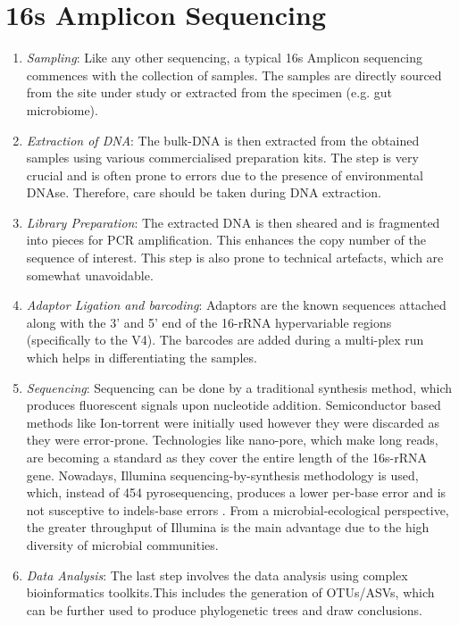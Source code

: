 \section{16s Amplicon Sequencing}

\begin{enumerate}
  \item \textit{Sampling}: Like any other sequencing, a typical 16s Amplicon sequencing commences with the collection of samples. The samples are directly sourced from the site under study or extracted from the specimen (e.g. gut microbiome).
  \item \textit{Extraction of DNA}: The bulk-DNA is then extracted from the obtained samples using various commercialised preparation kits. The step is very crucial and is often prone to errors due to the presence of environmental DNAse. Therefore, care should be taken during DNA extraction.
  \item \textit{Library Preparation}: The extracted DNA is then sheared and is fragmented into pieces for PCR amplification. This enhances the copy number of the sequence of interest. This step is also prone to technical artefacts, which are somewhat unavoidable. 
  \item \textit{Adaptor Ligation and barcoding}: Adaptors are the known sequences attached along with the 3' and 5' end of the 16-rRNA hypervariable regions (specifically to the V4). The barcodes are added during a multi-plex run which helps in differentiating the samples.
  \item \textit{Sequencing}: Sequencing can be done by a traditional synthesis method, which produces fluorescent signals upon nucleotide addition. Semiconductor based methods like Ion-torrent were initially used however they were discarded as they were error-prone. Technologies like nano-pore, which make long reads, are becoming a standard as they cover the entire length of the 16s-rRNA gene. Nowadays, Illumina sequencing-by-synthesis methodology is used, which, instead of 454 pyrosequencing, produces a lower per-base error and is not susceptive to indels-base errors \cite{ref14}. From a microbial-ecological perspective, the greater throughput of Illumina is the main advantage due to the high diversity of microbial communities.
  \item \textit{Data Analysis}: The last step involves the data analysis using complex bioinformatics toolkits.This includes the generation of OTUs/ASVs, which can be further used to produce phylogenetic trees and draw conclusions.
\end{enumerate}

